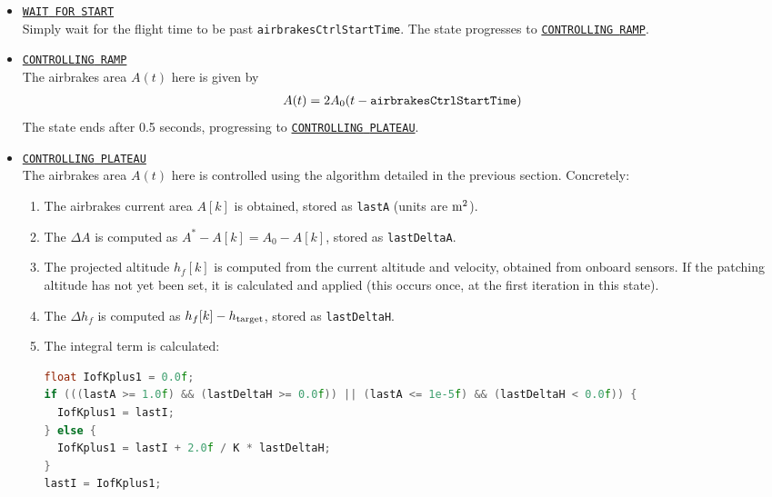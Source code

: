 \documentclass{amsdtx}
\begin{document}
\begin{itemize}
	\begin{align}
			{\tt cFudge} = 8.99999871\times 10^{-6} \cdot h_{\rm target}^2 - 1.10354984\times 10^{-1}\cdot h_{\rm target} + 3.38925325\times 10^2
	\end{align}
	\item {\color[HTML]{38761D} \underline{\tt WAIT\underline{~}FOR\underline{~}START}}\\[.5em]
	Simply wait for the flight time to be past {\tt airbrakesCtrlStartTime}. The state progresses to {\color[HTML]{CD6666} \underline{\tt CONTROLLING\underline{~}RAMP}}.\\
	\item {\color[HTML]{CD6666} \underline{\tt CONTROLLING\underline{~}RAMP}}\\[.5em]
	The airbrakes area $A(t)$ here is given by
	\begin{align}
		A(t) = 2A_0(t-{\tt airbrakesCtrlStartTime})
	\end{align}
	The state ends after 0.5 seconds, progressing to {\color[HTML]{96094F} \underline{\tt CONTROLLING\underline{~}PLATEAU}}.\\
	\item {\color[HTML]{96094F} \underline{\tt CONTROLLING\underline{~}PLATEAU}}\\[.5em]
	The airbrakes area $A(t)$ here is controlled using the algorithm detailed in the previous section. Concretely:
	\begin{enumerate}
		\item The airbrakes current area $A[k]$ is obtained, stored as {\tt lastA} (units are $\rm m^2$).
		\item The $\Delta A$ is computed as $A^*-A[k] = A_0-A[k]$, stored as {\tt lastDeltaA}.
		\item The projected altitude $h_f[k]$ is computed from the current altitude and velocity, obtained from onboard sensors. If the patching altitude has not yet been set, it is calculated and applied (this occurs once, at the first iteration in this state).
		\item The $\Delta h_f$ is computed as $h_f[k]-h_{\rm target}$, stored as {\tt lastDeltaH}. 
		\item The integral term is calculated:
		\begin{lstlisting}[language=c++]
float IofKplus1 = 0.0f;
if (((lastA >= 1.0f) && (lastDeltaH >= 0.0f)) || (lastA <= 1e-5f) && (lastDeltaH < 0.0f)) {
  IofKplus1 = lastI;
} else {
  IofKplus1 = lastI + 2.0f / K * lastDeltaH;
}
lastI = IofKplus1;\end{lstlisting}

\end{enumerate}
\end{itemize}
\end{document}
